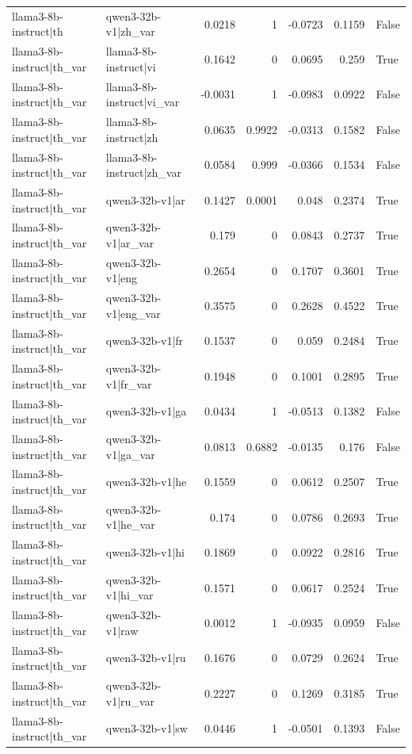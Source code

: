 \begin{table}
\begin{tabular}{l l r r r r l}
llama3-8b-instruct|th & qwen3-32b-v1|zh_var & 0.0218 & 1 & -0.0723 & 0.1159 & False \\
llama3-8b-instruct|th_var & llama3-8b-instruct|vi & 0.1642 & 0 & 0.0695 & 0.259 & True \\
llama3-8b-instruct|th_var & llama3-8b-instruct|vi_var & -0.0031 & 1 & -0.0983 & 0.0922 & False \\
llama3-8b-instruct|th_var & llama3-8b-instruct|zh & 0.0635 & 0.9922 & -0.0313 & 0.1582 & False \\
llama3-8b-instruct|th_var & llama3-8b-instruct|zh_var & 0.0584 & 0.999 & -0.0366 & 0.1534 & False \\
llama3-8b-instruct|th_var & qwen3-32b-v1|ar & 0.1427 & 0.0001 & 0.048 & 0.2374 & True \\
llama3-8b-instruct|th_var & qwen3-32b-v1|ar_var & 0.179 & 0 & 0.0843 & 0.2737 & True \\
llama3-8b-instruct|th_var & qwen3-32b-v1|eng & 0.2654 & 0 & 0.1707 & 0.3601 & True \\
llama3-8b-instruct|th_var & qwen3-32b-v1|eng_var & 0.3575 & 0 & 0.2628 & 0.4522 & True \\
llama3-8b-instruct|th_var & qwen3-32b-v1|fr & 0.1537 & 0 & 0.059 & 0.2484 & True \\
llama3-8b-instruct|th_var & qwen3-32b-v1|fr_var & 0.1948 & 0 & 0.1001 & 0.2895 & True \\
llama3-8b-instruct|th_var & qwen3-32b-v1|ga & 0.0434 & 1 & -0.0513 & 0.1382 & False \\
llama3-8b-instruct|th_var & qwen3-32b-v1|ga_var & 0.0813 & 0.6882 & -0.0135 & 0.176 & False \\
llama3-8b-instruct|th_var & qwen3-32b-v1|he & 0.1559 & 0 & 0.0612 & 0.2507 & True \\
llama3-8b-instruct|th_var & qwen3-32b-v1|he_var & 0.174 & 0 & 0.0786 & 0.2693 & True \\
llama3-8b-instruct|th_var & qwen3-32b-v1|hi & 0.1869 & 0 & 0.0922 & 0.2816 & True \\
llama3-8b-instruct|th_var & qwen3-32b-v1|hi_var & 0.1571 & 0 & 0.0617 & 0.2524 & True \\
llama3-8b-instruct|th_var & qwen3-32b-v1|raw & 0.0012 & 1 & -0.0935 & 0.0959 & False \\
llama3-8b-instruct|th_var & qwen3-32b-v1|ru & 0.1676 & 0 & 0.0729 & 0.2624 & True \\
llama3-8b-instruct|th_var & qwen3-32b-v1|ru_var & 0.2227 & 0 & 0.1269 & 0.3185 & True \\
llama3-8b-instruct|th_var & qwen3-32b-v1|sw & 0.0446 & 1 & -0.0501 & 0.1393 & False \\

\end{tabular}
\end{table}
